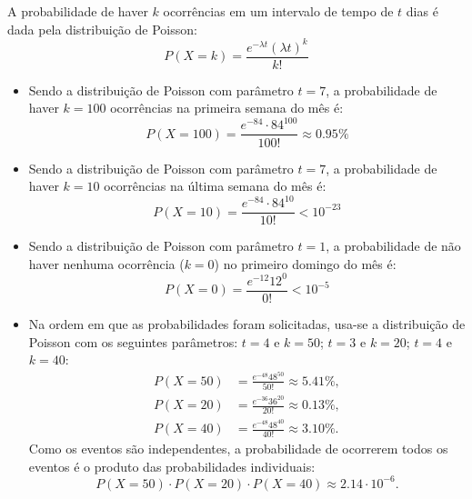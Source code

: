 \begin{respostas}
    A probabilidade de haver $k$ ocorrências em um intervalo de tempo de $t$ dias é dada pela distribuição de Poisson:
    \begin{equation}
        P(X = k) = \frac{e^{-\lambda t} (\lambda t)^k}{k!}
    \end{equation}
    \begin{itemize}
        \item[a)] Sendo a distribuição de Poisson com parâmetro $t = 7$, a probabilidade de haver $k=100$ ocorrências na primeira semana do mês é:
        \begin{equation}
            P(X = 100) = \frac{e^{-84} \cdot 84^{100}}{100!}
            \approx 0.95\%
        \end{equation}
        
        \item[b)] Sendo a distribuição de Poisson com parâmetro $t = 7$, a probabilidade de haver $k=10$ ocorrências na última semana do mês é:
        \begin{equation}
            P(X = 10) = \frac{e^{-84} \cdot 84^{10}}{10!}
            < 10^{-23}
        \end{equation}

        \item[c)] Sendo a distribuição de Poisson com parâmetro $t = 1$, a probabilidade de não haver nenhuma ocorrência ($k=0$) no primeiro domingo do mês é:
        \begin{equation}
            P(X = 0) = \frac{e^{-12} 12^0}{0!}
            < 10^{-5}
        \end{equation}

        \item[d)] Na ordem em que as probabilidades foram solicitadas, usa-se a distribuição de Poisson com os seguintes parâmetros:
        $t = 4$ e $k = 50$;
        $t = 3$ e $k = 20$;
        $t = 4$ e $k = 40$:
        \begin{align}
            P(X=50) &= \frac{e^{-48} 48^{50}}{50!} \approx 5.41\%, \\
            P(X=20) &= \frac{e^{-36} 36^{20}}{20!} \approx 0.13\%, \\
            P(X=40) &= \frac{e^{-48} 48^{40}}{40!} \approx 3.10\%.
        \end{align}
        Como os eventos são independentes, a probabilidade de ocorrerem todos os eventos é o produto das probabilidades individuais:
        \begin{equation}
            P(X=50) \cdot P(X=20) \cdot P(X=40) \approx 2.14 \cdot 10^{-6}.
        \end{equation}
    \end{itemize}
\end{respostas}